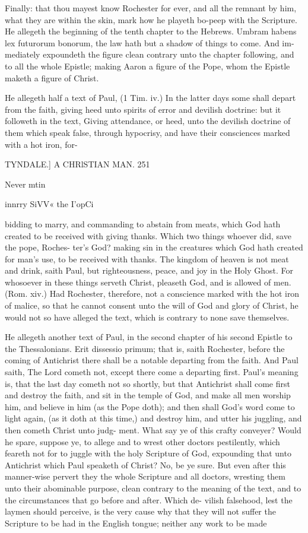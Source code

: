 \documentclass{custom}
\begin{document}
{Finally: that thou mayest know Rochester for ever, 
and all the remnant by him, what they are within the 
skin, mark how he playeth bo-peep with the Scripture. 
He allegeth the beginning of the tenth chapter to the 
Hebrews. Umbram habens lex futurorum bonorum, 
the law hath but a shadow of things to come. And im- 
mediately expoundeth the figure clean contrary unto the 
chapter following, and to all the whole Epistle; making 
Aaron a figure of the Pope, whom the Epistle maketh a 
figure of Christ. 

He allegeth half a text of Paul, (1 Tim. iv.) In the 
latter days some shall depart from the faith, giving heed 
unto spirits of error and devilish doctrine: but it followeth 
in the text, Giving attendance, or heed, unto the devilish 
doctrine of them which speak false, through hypocrisy, 
and have their consciences marked with a hot iron, for- 


TYNDALE.]
A CHRlSTIAN MAN.
251

Never mtin 

innrry SiVV« 
the I'opCi 

bidding to marry, and commanding to abstain from meats, 
which God hath created to be received with giving thanks. 
Which two things whoever did, save the pope, Roches-
ter's God? making sin in the creatures which God hath 
created for man's use, to be received with thanks. The 
kingdom of heaven is not meat and drink, saith Paul, but 
righteousness, peace, and joy in the Holy Ghost. For 
whosoever in these things serveth Christ, pleaseth God, 
and is allowed of men. (Rom. xiv.) Had Rochester, 
therefore, not a conscience marked with the hot iron of 
malice, so that he cannot consent unto the will of God 
and glory of Christ, he would not so have alleged the 
text, which is contrary to none save themselves. 

He allegeth another text of Paul, in the second chapter 
of his second Epistle to the Thessalonians. Erit dissessio 
primum; that is, saith Rochester, before the coming of 
Antichrist there shall be a notable departing from the 
faith. And Paul saith, The Lord cometh not, except 
there come a departing first. Paul's meaning is, that the 
last day cometh not so shortly, but that Antichrist shall 
come first and destroy the faith, and sit in the temple of 
God, and make all men worship him, and believe in him 
(as the Pope doth); and then shall God's word come to 
light again, (as it doth at this time,) and destroy him, and 
utter his juggling, and then cometh Christ unto judg- 
ment. What say ye of this crafty conveyer? Would he 
spare, suppose ye, to allege and to wrest other doctors 
pestilently, which feareth not for to juggle with the holy 
Scripture of God, expounding that unto Antichrist which 
Paul speaketh of Christ? No, be ye sure. But even 
after this manner-wise pervert they the whole Scripture 
and all doctors, wresting them unto their abominable 
purpose, clean contrary to the meaning of the text, and to 
the circumstances that go before and after. Which de- 
vilish falsehood, lest the laymen should perceive, is the 
very cause why that they will not suffer the Scripture to be
had in the English tongue; neither any work to be made

}
\end{document}
